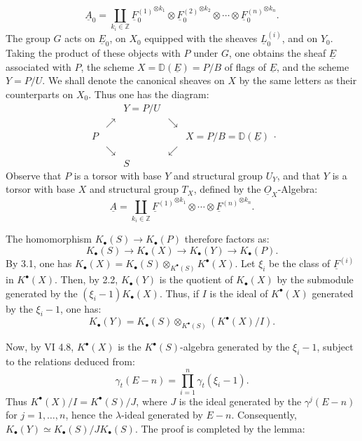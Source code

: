 %

\[
\underline{A}_0=\coprod_{k_i\in\mathbb Z}{\underline{F}_0^{(1)}}^{\otimes k_1}\otimes {\underline{F}_0^{(2)}}^{\otimes k_2}\otimes\cdots\otimes{\underline{F}_0^{(n)}}^{\otimes k_n}.
\]
The group $G$ acts on $\underline{E}_0$, on $X_0$ equipped with the sheaves $\underline{L}_0^{(i)}$, and on $Y_0$. Taking the product of these objects with $P$ under $G$, one obtains the sheaf $\underline{E}$ associated with $P$, the scheme $X=\mathbb D(\underline{E})=P/B$ of flags of $\underline{E}$, and the scheme $Y=P/U$. We shall denote the canonical sheaves on $X$ by the same letters as their counterparts on $X_0$. Thus one has the diagram:
\[
\begin{array}{ccccc}
&& Y=P/U &&\\[-0.2em]
& \nearrow && \searrow &\\[-0.2em]
P &&&& X=P/B=\mathbb D(\underline{E})\\[-0.2em]
& \searrow && \swarrow &\\[-0.2em]
&& S &&
\end{array}.
\]
Observe that $P$ is a torsor with base $Y$ and structural group $U_Y$, and that $Y$ is a torsor with base $X$ and structural group $T_X$, defined by the $\underline{O}_X$-Algebra:
\[
\underline{A}=\coprod_{k_i\in\mathbb Z}{\underline{F}^{(1)}}^{\otimes k_1}\otimes\cdots\otimes{\underline{F}^{(n)}}^{\otimes k_n}.
\]

The homomorphism $K_\bullet(S)\to K_\bullet(P)$ therefore factors as:
\[
K_\bullet(S)\longrightarrow K_\bullet(X)\longrightarrow K_\bullet(Y)\longrightarrow K_\bullet(P).
\]
By 3.1, one has $K_\bullet(X)=K_\bullet(S)\otimes_{K^{\bullet}(S)}K^{\bullet}(X)$. Let $\xi_i$ be the class of $\underline{F}^{(i)}$ in $K^{\bullet}(X)$. Then, by 2.2, $K_\bullet(Y)$ is the quotient of $K_\bullet(X)$ by the submodule generated by the $(\xi_i-1)K_\bullet(X)$. Thus, if $I$ is the ideal of $K^{\bullet}(X)$ generated by the $\xi_i-1$, one has:
\[
K_\bullet(Y)=K_\bullet(S)\otimes_{K^{\bullet}(S)}(K^{\bullet}(X)/I).
\]


%

Now, by VI 4.8, $K^{\bullet}(X)$ is the $K^{\bullet}(S)$-algebra generated by the $\xi_i-1$, subject to the relations deduced from:
\[
\gamma_t(E-n)=\prod_{i=1}^n\gamma_t(\xi_i-1).
\]
Thus $K^{\bullet}(X)/I=K^{\bullet}(S)/J$, where $J$ is the ideal generated by the $\gamma^j(E-n)$ for $j=1,\ldots,n$, hence the $\lambda$-ideal generated by $E-n$. Consequently, $K_\bullet(Y)\simeq K_\bullet(S)/J K_\bullet(S)$. The proof is completed by the lemma:

